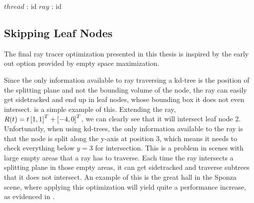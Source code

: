\begin{algorithm}
  \caption{Converting a thread id to a ray id.}
  \label{alg:packet}
  \begin{algorithmic}
              {$thread$ : id}
              {$ray$ : id}
              {
              }
  \end{algorithmic}
\end{algorithm}


\subsection{Skipping Leaf Nodes}


The final ray tracer optimization presented in this thesis is inspired by the
early out option provided by empty space maximization.


Since the only information available to ray traversing a kd-tree is the position
of the splitting plane and not the bounding volume of the node, the ray can
easily get sidetracked and end up in leaf nodes, whose bounding box it does not
even intersect.  is a simple example of this. Extending
the ray, $R(t) = t \left[1, 1 \right]^T + \left[-4, 0 \right]^T$, we can clearly see that it
will intersect leaf node 2. Unfortunatly, when using kd-trees, the only
information available to the ray is that the node is split along the y-axis at
position 3, which means it needs to check everything below $y=3$ for
intersection. This is a problem in scenes with large empty areas that a ray has
to traverse. Each time the ray intersects a splitting plane in those empty
areas, it can get sidetracked and traverse subtrees that it does not
intersect. An example of this is the great hall in the Sponza scene, where
applying this optimization will yield quite a performance increase, as evidenced
in .

